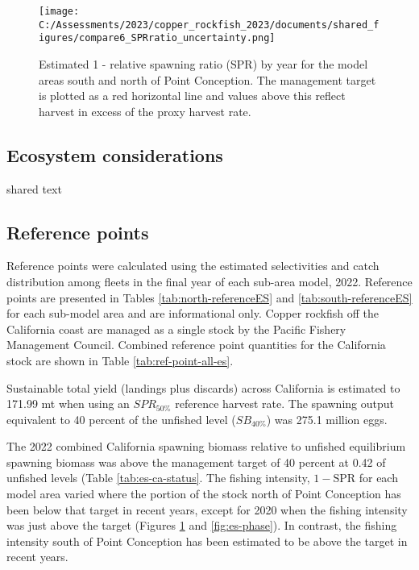 \documentclass[11pt,
  english,
  letterpaper,
]{article}
\begin{document}




\begin{figure}
\centering
\texttt{[image: C:/Assessments/2023/copper\_rockfish\_2023/documents/shared\_figures/compare6\_SPRratio\_uncertainty.png]}
\caption{Estimated 1 - relative spawning ratio (SPR) by year for the model areas south and north of Point Conception. The management target is plotted as a red horizontal line and values above this reflect harvest in excess of the proxy harvest rate.\label{fig:es-1-spr}}
\end{figure}

\pagebreak

\hypertarget{ecosystem-considerations}{%
\subsection*{Ecosystem considerations}\label{ecosystem-considerations}}

shared text

\hypertarget{reference-points}{%
\subsection*{Reference points}\label{reference-points}}

Reference points were calculated using the estimated selectivities and catch distribution among fleets in the final year of each sub-area model, 2022. Reference points are presented in Tables \ref{tab:north-referenceES} and \ref{tab:south-referenceES} for each sub-model area and are informational only. Copper rockfish off the California coast are managed as a single stock by the Pacific Fishery Management Council. Combined reference point quantities for the California stock are shown in Table \ref{tab:ref-point-all-es}.

Sustainable total yield (landings plus discards) across California is estimated to 171.99 mt when using an \(SPR_{50\%}\) reference harvest rate. The spawning output equivalent to 40 percent of the unfished level (\(SB_{40\%}\)) was 275.1 million eggs.

The 2022 combined California spawning biomass relative to unfished equilibrium spawning biomass was above the management target of 40 percent at 0.42 of unfished levels (Table \ref{tab:es-ca-status}. The fishing intensity, \(1-\text{SPR}\) for each model area varied where the portion of the stock north of Point Conception has been below that target in recent years, except for 2020 when the fishing intensity was just above the target (Figures \ref{fig:es-1-spr} and \ref{fig:es-phase}). In contrast, the fishing intensity south of Point Conception has been estimated to be above the target in recent years.
\end{document}
